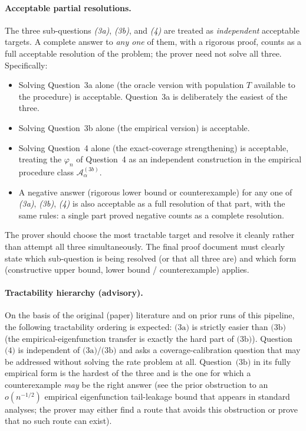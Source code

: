 \documentclass{article}
\begin{document}
\paragraph{Acceptable partial resolutions.}
The three sub-questions \emph{(3a)}, \emph{(3b)}, and \emph{(4)} are
treated as \emph{independent} acceptable targets. A complete answer
to \emph{any one} of them, with a rigorous proof, counts as a full
acceptable resolution of the problem; the prover need not solve all
three. Specifically:
\begin{itemize}
  \item Solving Question~3a alone (the oracle version with population
    \(T\) available to the procedure) is acceptable. Question~3a is
    deliberately the easiest of the three.
  \item Solving Question~3b alone (the empirical version) is
    acceptable.
  \item Solving Question~4 alone (the exact-coverage strengthening) is
    acceptable, treating the \(\varphi_n\) of Question~4 as an
    independent construction in the empirical procedure class
    \(\mathcal A_\alpha^{(3b)}\).
  \item A negative answer (rigorous lower bound or counterexample)
    for any one of \emph{(3a)}, \emph{(3b)}, \emph{(4)} is also
    acceptable as a full resolution of that part, with the same
    rules: a single part proved negative counts as a complete
    resolution.
\end{itemize}
The prover should choose the most tractable target and resolve it
cleanly rather than attempt all three simultaneously. The final
proof document must clearly state which sub-question is being
resolved (or that all three are) and which form (constructive
upper bound, lower bound / counterexample) applies.

\paragraph{Tractability hierarchy (advisory).}
On the basis of the original (paper) literature and on prior runs of
this pipeline, the following tractability ordering is expected:
\(\text{(3a)}\) is strictly easier than \(\text{(3b)}\) (the
empirical-eigenfunction transfer is exactly the hard part of
\(\text{(3b)}\)). Question~\(\text{(4)}\) is independent of
\(\text{(3a)}\)/\(\text{(3b)}\) and asks a coverage-calibration
question that may be addressed without solving the rate problem at
all. Question~\(\text{(3b)}\) in its fully empirical form is the
hardest of the three and is the one for which a counterexample
\emph{may} be the right answer (see the prior obstruction to an
\(o(n^{-1/2})\) empirical eigenfunction tail-leakage bound that
appears in standard analyses; the prover may either find a route
that avoids this obstruction or prove that no such route can exist).




\newpage
\end{document}
